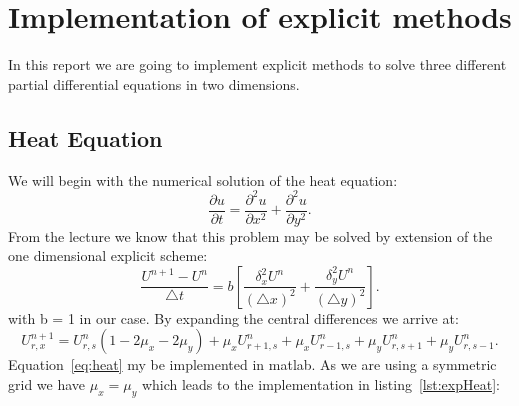\documentclass[ twoside,openright,titlepage,numbers=noenddot,headinclude,%
                footinclude=true,cleardoublepage=empty,abstractoff, %
                BCOR=5mm,paper=a4,fontsize=11pt,%
                ngerman,american,%
                ]{scrreprt}
\begin{document}
\frenchspacing
\raggedbottom
{} %
\pagestyle{plain}

%
\pagestyle{scrheadings}



\chapter{Implementation of explicit methods}
In this report we are going to implement explicit methods to solve three different partial differential equations in two dimensions.
\section{Heat Equation}
We will begin with the numerical solution of the heat equation:
\begin{equation}
\frac{\partial u}{\partial t} = \frac{\partial^2 u}{\partial x^2} + \frac{\partial^2 u}{\partial y^2}.
\end{equation}
From the lecture we know that this problem may be solved by extension of the one dimensional explicit scheme:
\begin{equation}
\frac{U^{n+1}-U^{n}}{\triangle t} = b [\frac{\delta_x^2 U^n}{(\triangle x)^2} + \frac{\delta_y^2 U^n}{(\triangle y)^2} ].
\end{equation}
with b = 1 in our case. By expanding the central differences we arrive at:
\begin{equation}
U_{r,x}^{n+1} = U_{r,s}^n (1 - 2\mu_x - 2\mu_y) + \mu_x U_{r+1,s}^n + \mu_x U_{r-1,s}^n + \mu_y U_{r,s+1}^n + \mu_y U_{r,s-1}^n.
\label{eq:heat}
\end{equation}
Equation~\ref{eq:heat} my be implemented in matlab.  As we are using a symmetric grid we have $\mu_x = \mu_y$ which leads to the implementation in listing~\ref{lst:expHeat}: 

\end{document}
